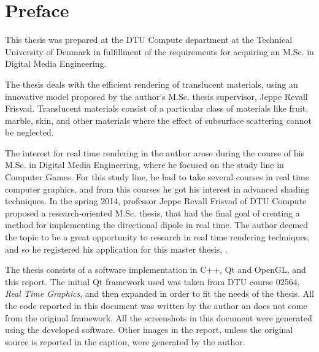 \chapter{Preface}

\vspace{1cm}
This thesis was prepared at the DTU Compute department at the Technical University of Denmark in fulfillment of the requirements for acquiring an M.Sc. in Digital Media Engineering. 

The thesis deals with the efficient rendering of translucent materials, using an innovative model proposed by the author's M.Sc. thesis supervisor, Jeppe Revall Frisvad. Translucent materials consist of a particular class of materials like fruit, marble, skin, and other materials where the effect of subsurface scattering cannot be neglected. 

The interest for real time rendering in the author arose during the course of his M.Sc. in Digital Media Engineering, where he focused on the study line in Computer Games. For this study line, he had to take several courses in real time computer graphics, and from this courses he got his interest in advanced shading techniques. In the spring 2014, professor Jeppe Revall Frisvad of DTU Compute proposed a research-oriented M.Sc. thesis, that had the final goal of creating a method for implementing the directional dipole in real time. The author deemed the topic to be a great opportunity to research in real time rendering techniques, and so he registered his application for this master thesis, \emph{\thesistitle}.

The thesis consists of a software implementation in C++, Qt and OpenGL, and this report. The initial Qt framework used was taken from DTU course 02564, \emph{Real Time Graphics}, and then expanded in order to fit the needs of the thesis. All the code reported in this document was written by the author an does not come from the original framework. All the screenshots in this document were generated using the developed software. Other images in the report, unless the original source is reported in the caption, were generated by the author.

